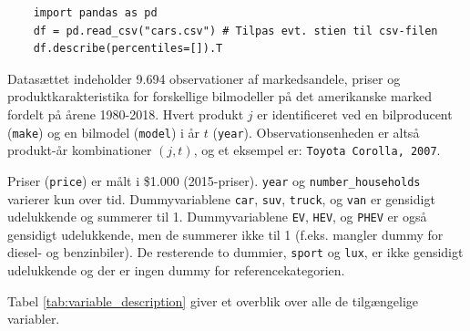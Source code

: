 \documentclass[a4paper,12pt]{article}
\begin{document}
\begin{verbatim}
    import pandas as pd
    df = pd.read_csv("cars.csv") # Tilpas evt. stien til csv-filen
    df.describe(percentiles=[]).T
    \end{verbatim}
\noindent
\noindent Datasættet indeholder 9.694 observationer af markedsandele, priser og produktkarakteristika for forskellige bilmodeller på det amerikanske marked fordelt på årene 1980-2018. Hvert produkt $j$ er identificeret ved en bilproducent (\texttt{make}) og en bilmodel (\texttt{model}) i år $t$ (\texttt{year}). Observationsenheden er altså produkt-år kombinationer $(j,t)$, og et eksempel er: \texttt{Toyota Corolla, 2007}.

Priser (\texttt{price}) er målt i \$1.000 (2015-priser). \texttt{year} og \texttt{number\_households} varierer kun over tid. Dummyvariablene \texttt{car}, \texttt{suv}, \texttt{truck}, og \texttt{van} er gensidigt udelukkende og summerer til 1. Dummyvariablene \texttt{EV}, \texttt{HEV}, og \texttt{PHEV} er også gensidigt udelukkende, men de summerer ikke til 1 (f.eks. mangler dummy for diesel- og benzinbiler). De resterende to dummier, \texttt{sport} og \texttt{lux}, er ikke gensidigt udelukkende og der er ingen dummy for referencekategorien. 

Tabel \ref{tab:variable_description} giver et overblik over alle de tilgængelige variabler.
\end{document}
